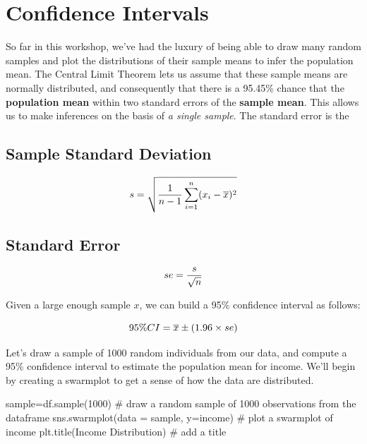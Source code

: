 \documentclass[
  letterpaper,
  DIV=11,
  numbers=noendperiod]{scrreprt}
\newenvironment{Shaded}{\begin{snugshade}}{\end{snugshade}}
\newcommand{\CommentTok}[1]{\textcolor[rgb]{0.37,0.37,0.37}{#1}}
\newcommand{\DecValTok}[1]{\textcolor[rgb]{0.68,0.00,0.00}{#1}}
\newcommand{\NormalTok}[1]{\textcolor[rgb]{0.00,0.23,0.31}{#1}}
\newcommand{\OperatorTok}[1]{\textcolor[rgb]{0.37,0.37,0.37}{#1}}
\newcommand{\StringTok}[1]{\textcolor[rgb]{0.13,0.47,0.30}{#1}}
\begin{document}
\hypertarget{confidence-intervals}{%
\section{Confidence Intervals}\label{confidence-intervals}}

So far in this workshop, we've had the luxury of being able to draw many
random samples and plot the distributions of their sample means to infer
the population mean. The Central Limit Theorem lets us assume that these
sample means are normally distributed, and consequently that there is a
95.45\% chance that the \textbf{population mean} within two standard
errors of the \textbf{sample mean}. This allows us to make inferences on
the basis of \emph{a single sample}. The standard error is the

\hypertarget{sample-standard-deviation}{%
\subsection{Sample Standard Deviation}\label{sample-standard-deviation}}

\[\huge s = \sqrt{\frac{1}{n-1} \sum_{i=1}^n (x_i - \overline{x})^2}\]

\hypertarget{standard-error}{%
\subsection{Standard Error}\label{standard-error}}

\[\huge se = \frac{s}{\sqrt{n}}\]

Given a large enough sample \(x\), we can build a 95\% confidence
interval as follows:

\[ \huge 95\% CI = \overline{x} \pm (1.96 \times se)\]

Let's draw a sample of 1000 random individuals from our data, and
compute a 95\% confidence interval to estimate the population mean for
income. We'll begin by creating a swarmplot to get a sense of how the
data are distributed.

\begin{Shaded}
\begin{Highlighting}[]
\NormalTok{sample}\OperatorTok{=}\NormalTok{df.sample(}\DecValTok{1000}\NormalTok{) }\CommentTok{\# draw a random sample of 1000 observations from the dataframe}
\NormalTok{sns.swarmplot(data }\OperatorTok{=}\NormalTok{ sample, y}\OperatorTok{=}\StringTok{\textquotesingle{}income\textquotesingle{}}\NormalTok{) }\CommentTok{\# plot a swarmplot of income}
\NormalTok{plt.title(}\StringTok{\textquotesingle{}Income Distribution\textquotesingle{}}\NormalTok{) }\CommentTok{\# add a title}
\end{Highlighting}
\end{Shaded}
\end{document}
